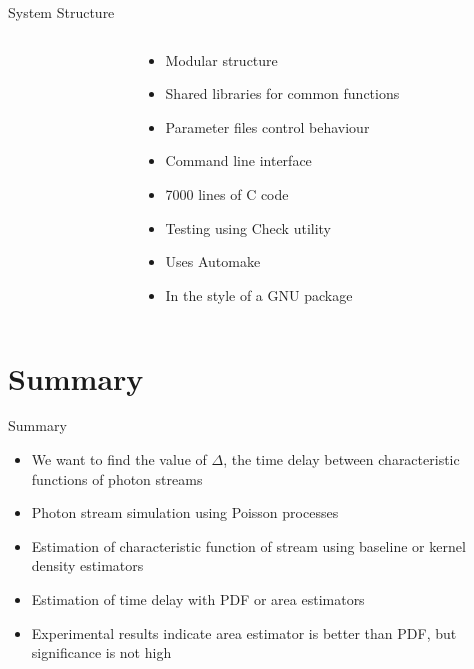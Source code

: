 \documentclass{beamer}
\begin{document}
\begin{frame}{System Structure}
\begin{columns}[t]
\begin{column}{0.5\textwidth}
\begin{adjustbox}{max size={.95\textwidth}{.8\textheight}}
      \end{adjustbox}
    \end{column}
    \begin{column}{0.5\textwidth}
      \begin{itemize}
      \item Modular structure
      \item Shared libraries for common functions
      \item Parameter files control behaviour
      \item Command line interface
      \item 7000 lines of C code
      \item Testing using Check utility
      \item Uses Automake
      \item In the style of a GNU package
      \end{itemize}
    \end{column}
  \end{columns}
 \end{frame}

\section*{Summary}

\begin{frame}{Summary}

  \begin{itemize}[<+->]
  \item We want to find the value of $\Delta$, the time delay between
    characteristic functions of photon streams
  \item Photon stream simulation using Poisson processes
  \item Estimation of characteristic function of stream using baseline or kernel density estimators
  \item Estimation of time delay with PDF or area estimators
  \item Experimental results indicate area estimator is better than PDF, but
    significance is not high
  \end{itemize}
\end{frame}
\end{document}
